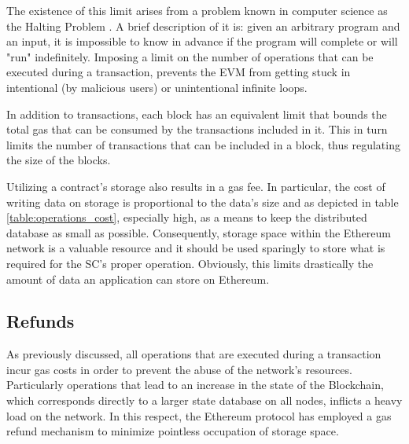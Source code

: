 The existence of this limit arises from a problem known in computer science as the Halting Problem \citep{burkholder_1987}. A brief description of it is: given an arbitrary program and an input, it is impossible to know in advance if the program will complete or will "run" indefinitely. Imposing a limit on the number of operations that can be executed during a transaction, prevents the EVM from getting stuck in intentional (by malicious users) or unintentional infinite loops.

In addition to transactions, each block has an equivalent limit that bounds the total gas that can be consumed by the transactions included in it. This in turn limits the number of transactions that can be included in a block, thus regulating the size of the blocks.

Utilizing a contract’s storage also results in a gas fee. In particular, the cost of writing data on storage is proportional to the data’s size and as depicted in table \ref{table:operations_cost}, especially high, as a means to keep the distributed database as small as possible. Consequently, storage space within the Ethereum network is a valuable resource and it should be used sparingly to store what is required for the SC's proper operation. Obviously, this limits drastically the amount of data an application can store on Ethereum.

\subsection{Refunds}\label{sec:gas}
As previously discussed, all operations that are executed during a transaction incur gas costs in order to prevent the abuse of the network's resources. Particularly operations that lead to an increase in the state of the Blockchain, which corresponds directly to a larger state database on all nodes, inflicts a heavy load on the network. In this respect, the Ethereum protocol has employed a gas refund mechanism to minimize pointless occupation of storage space.

